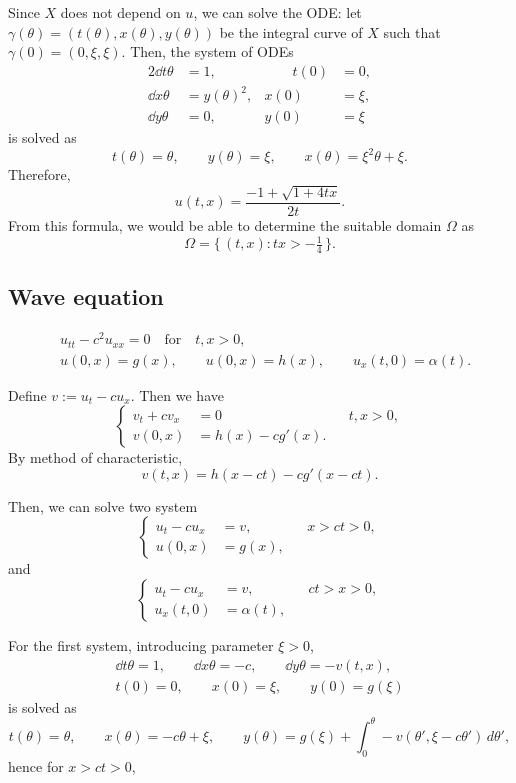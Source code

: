 \documentclass[a4paper]{article}
\begin{document}
Since $X$ does not depend on $u$, we can solve the ODE: let $\gamma(\theta)=(t(\theta),x(\theta),y(\theta))$ be the integral curve of $X$ such that $\gamma(0)=(0,\xi,\xi)$.
Then, the system of ODEs
\begin{alignat*}{2}
\dd{t}{\theta}&=1,   &\qquad t(0)&=0,\\
\dd{x}{\theta}&=y(\theta)^2, & x(0)&=\xi,\\
\dd{y}{\theta}&=0,   & y(0)&=\xi
\end{alignat*}
is solved as
\[t(\theta)=\theta,\qquad y(\theta)=\xi,\qquad x(\theta)=\xi^2\theta+\xi.\]
Therefore,
\[u(t,x)=\frac{-1+\sqrt{1+4tx}}{2t}.\]
From this formula, we would be able to determine the suitable domain $\Omega$ as
\[\Omega=\{\,(t,x):tx>-\tfrac14\,\}.\]


\subsection{Wave equation}

\begin{align*}
&u_{tt}-c^2u_{xx}=0 \quad\text{for}\quad t,x>0, \\
&u(0,x)=g(x),\qquad u(0,x)=h(x),\qquad u_x(t,0)=\alpha(t).
\end{align*}

Define $v:=u_t-cu_x$.
Then we have
\[\left\{\begin{alignedat}{2}
v_t+cv_x &= 0 && t,x>0,\\
v(0,x) &= h(x)-cg'(x). &&
\end{alignedat}\right.\]
By method of characteristic,
\[v(t,x)=h(x-ct)-cg'(x-ct).\]

Then, we can solve two system
\[\left\{\begin{alignedat}{2}
u_t-cu_x &= v, && x>ct>0,\\
u(0,x) &= g(x), &&
\end{alignedat}\right.\]
and
\[\left\{\begin{alignedat}{2}
u_t-cu_x &= v, && ct>x>0,\\
u_x(t,0) &= \alpha(t), &&
\end{alignedat}\right.\]

For the first system, introducing parameter $\xi>0$,
\begin{gather*}
\dd{t}{\theta}=1,\qquad\dd{x}{\theta}=-c,\qquad\dd{y}{\theta}=-v(t,x),\\
t(0)=0,\qquad x(0)=\xi,\qquad y(0)=g(\xi)
\end{gather*}
is solved as
\[t(\theta)=\theta,\qquad x(\theta)=-c\theta+\xi,\qquad y(\theta)=g(\xi)+\int_0^\theta-v(\theta',\xi-c\theta')\,d\theta',\]
hence for $x>ct>0$,
\end{document}

